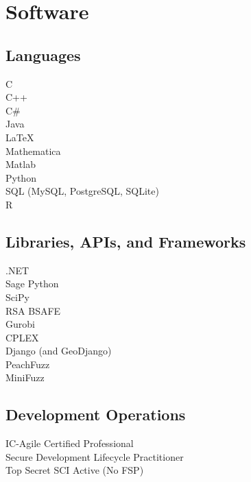 \documentclass{deedy-resume} %
\begin{document}
\begin{minipage}[t]{0.33\textwidth}
\sectionspace %


\section{Software}

\subsection{Languages}

C\\
C++\\
C\#\\
Java\\
\LaTeX\\
Mathematica\\
Matlab\\
Python\\
SQL (MySQL, PostgreSQL, SQLite)\\
R\\



\sectionspace %


\subsection{Libraries, APIs, and Frameworks}

.NET\\
Sage Python\\
SciPy\\
RSA BSAFE\\
Gurobi\\
CPLEX\\
Django (and GeoDjango)\\
PeachFuzz\\
MiniFuzz\\
\subsection{Development Operations}

IC-Agile Certified Professional\\
Secure Development Lifecycle Practitioner\\
Top Secret SCI Active (No FSP)\\


\end{minipage}
\end{document}
